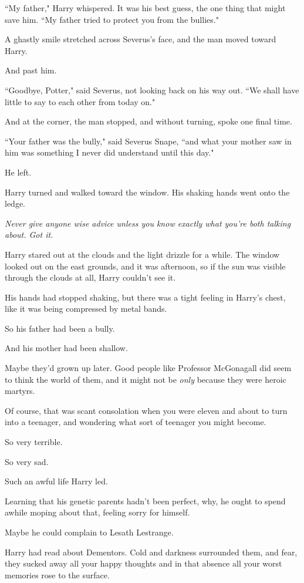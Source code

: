 ``My father," Harry whispered. It was his best guess, the one thing that might save him. ``My father tried to protect you from the bullies."

A ghastly smile stretched across Severus's face, and the man moved toward Harry.

And past him.

``Goodbye, Potter," said Severus, not looking back on his way out. ``We shall have little to say to each other from today on."

And at the corner, the man stopped, and without turning, spoke one final time.

``Your father was the bully," said Severus Snape, ``and what your mother saw in him was something I never did understand until this day."

He left.

Harry turned and walked toward the window. His shaking hands went onto the ledge.

\emph{Never give anyone wise advice unless you know exactly what you're both talking about. Got it.}

Harry stared out at the clouds and the light drizzle for a while. The window looked out on the east grounds, and it was afternoon, so if the sun was visible through the clouds at all, Harry couldn't see it.

His hands had stopped shaking, but there was a tight feeling in Harry's chest, like it was being compressed by metal bands.

So his father had been a bully.

And his mother had been shallow.

Maybe they'd grown up later. Good people like Professor McGonagall did seem to think the world of them, and it might not be \emph{only} because they were heroic martyrs.

Of course, that was scant consolation when you were eleven and about to turn into a teenager, and wondering what sort of teenager you might become.

So very terrible.

So very sad.

Such an awful life Harry led.

Learning that his genetic parents hadn't been perfect, why, he ought to spend awhile moping about that, feeling sorry for himself.

Maybe he could complain to Lesath Lestrange.

Harry had read about Dementors. Cold and darkness surrounded them, and fear, they sucked away all your happy thoughts and in that absence all your worst memories rose to the surface.


